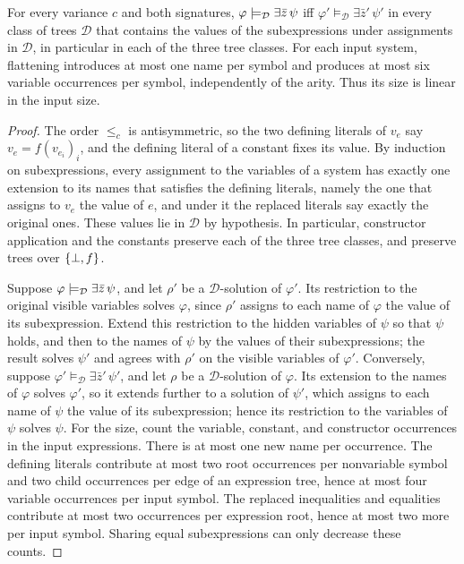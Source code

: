 \begin{lemma}[Flattening]\label{lem:bg-flattening}
For every variance $c$ and both signatures,
$\varphi\models_{\mathcal D}\exists\bar z\,\psi$ iff
$\varphi'\models_{\mathcal D}\exists\bar z'\,\psi'$ in every class of trees
$\mathcal D$ that contains the values of the subexpressions under assignments
in $\mathcal D$, in particular in each of the three tree classes.
For each input system, flattening introduces at most one name per symbol and
produces at most six variable occurrences per symbol, independently of the
arity. Thus its size is linear in the input size.
\end{lemma}
\begin{proof}
The order $\le_c$ is antisymmetric, so the two defining literals of $v_e$ say
$v_e=f(v_{e_i})_i$, and the defining literal of a constant fixes its value. By
induction on subexpressions, every assignment to the variables of a system has
exactly one extension to its names that satisfies the defining literals, namely
the one that assigns to $v_e$ the value of $e$, and under it the replaced
literals say exactly the original ones. These values lie in $\mathcal D$ by
hypothesis. In particular, constructor application and the constants preserve
each of the three tree classes, and preserve trees over $\{\bot,f\}$.

Suppose $\varphi\models_{\mathcal D}\exists\bar z\,\psi$, and let $\rho'$ be a
$\mathcal D$-solution of $\varphi'$. Its restriction to the original visible
variables solves $\varphi$, since $\rho'$ assigns to each name of $\varphi$ the
value of its subexpression. Extend this restriction to the hidden variables of
$\psi$ so that $\psi$ holds, and then to the names of $\psi$ by the values of
their subexpressions; the result solves $\psi'$ and agrees with $\rho'$ on the
visible variables of $\varphi'$. Conversely, suppose
$\varphi'\models_{\mathcal D}\exists\bar z'\,\psi'$, and let $\rho$ be a
$\mathcal D$-solution of $\varphi$. Its extension to the names of $\varphi$
solves $\varphi'$, so it extends further to a solution of $\psi'$, which assigns
to each name of $\psi$ the value of its subexpression; hence its restriction to
the variables of $\psi$ solves $\psi$. For the size, count the variable,
constant, and constructor occurrences in the input expressions. There is at
most one new name per occurrence. The defining literals contribute at most
two root occurrences per nonvariable symbol and two child occurrences per
edge of an expression tree, hence at most four variable occurrences per input
symbol. The replaced inequalities and equalities contribute at most two
occurrences per expression root, hence at most two more per input symbol.
Sharing equal subexpressions can only decrease these counts.
\end{proof}

